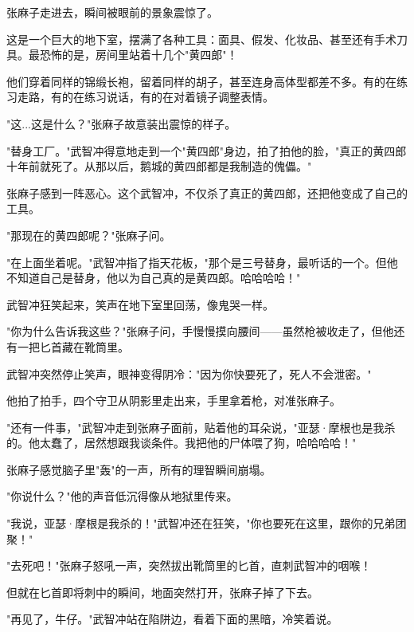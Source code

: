 张麻子走进去，瞬间被眼前的景象震惊了。

这是一个巨大的地下室，摆满了各种工具：面具、假发、化妆品、甚至还有手术刀具。最恐怖的是，房间里站着十几个"黄四郎"！

他们穿着同样的锦缎长袍，留着同样的胡子，甚至连身高体型都差不多。有的在练习走路，有的在练习说话，有的在对着镜子调整表情。

"这...这是什么？"张麻子故意装出震惊的样子。

"替身工厂。"武智冲得意地走到一个"黄四郎"身边，拍了拍他的脸，"真正的黄四郎十年前就死了。从那以后，鹅城的黄四郎都是我制造的傀儡。"

张麻子感到一阵恶心。这个武智冲，不仅杀了真正的黄四郎，还把他变成了自己的工具。

"那现在的黄四郎呢？"张麻子问。

"在上面坐着呢。"武智冲指了指天花板，"那个是三号替身，最听话的一个。但他不知道自己是替身，他以为自己真的是黄四郎。哈哈哈哈！"

武智冲狂笑起来，笑声在地下室里回荡，像鬼哭一样。

"你为什么告诉我这些？"张麻子问，手慢慢摸向腰间——虽然枪被收走了，但他还有一把匕首藏在靴筒里。

武智冲突然停止笑声，眼神变得阴冷："因为你快要死了，死人不会泄密。"

他拍了拍手，四个守卫从阴影里走出来，手里拿着枪，对准张麻子。

"还有一件事，"武智冲走到张麻子面前，贴着他的耳朵说，"亚瑟·摩根也是我杀的。他太蠢了，居然想跟我谈条件。我把他的尸体喂了狗，哈哈哈哈！"

张麻子感觉脑子里"轰"的一声，所有的理智瞬间崩塌。

"你说什么？"他的声音低沉得像从地狱里传来。

"我说，亚瑟·摩根是我杀的！"武智冲还在狂笑，"你也要死在这里，跟你的兄弟团聚！"

"去死吧！"张麻子怒吼一声，突然拔出靴筒里的匕首，直刺武智冲的咽喉！

但就在匕首即将刺中的瞬间，地面突然打开，张麻子掉了下去。

"再见了，牛仔。"武智冲站在陷阱边，看着下面的黑暗，冷笑着说。
